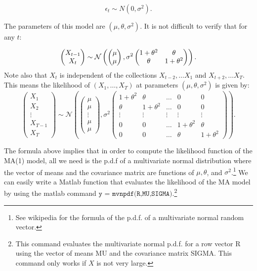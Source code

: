 \documentclass[12] {article}
\begin{document}
$$ \epsilon_{t} \sim N(0, \sigma^2).$$

\noindent The parameters of this model are $(\mu, \theta, \sigma^2)$. It is not difficult to verify that for any $t$:

$$   
\begin{pmatrix}
X_{t-1} \\
X_{t}
\end{pmatrix} \sim 
\mathcal{N} 
\left( 
\begin{pmatrix}
\mu \\
\mu
\end{pmatrix}, \\
\sigma^2 \begin{pmatrix}
1+ \theta^2 & \theta \\
\theta & 1+ \theta^2
\end{pmatrix}
\right).
$$
\noindent Note also that $X_{t}$ is independent of the collections $X_{t-2}, \ldots X_{1}$ and  $X_{t+2}, \ldots X_{T}$. This means the likelihood of $(X_1,\ldots, X_{T})$ at parameters $(\mu, \theta, \sigma^2)$
is given by:
\begin{equation}\label{equation:LikelihoodMA1}
\begin{pmatrix}
X_1 \\ X_2 \\ \vdots \\ X_{T-1} \\ X_{T} 
\end{pmatrix}
\sim \mathcal{N} \left( 
\begin{pmatrix}
\mu \\ \mu \\ \vdots \\ \mu \\ \mu
\end{pmatrix}, 
\sigma^2
\begin{pmatrix}
1 + \theta^2 & \theta & \ldots & 0 & 0 \\
\theta & 1+\theta^2 & \ldots & 0 &0 \\
\vdots & \vdots & \vdots & \vdots & \vdots \\
0 & 0 & \ldots & 1+\theta^2 & \theta \\
0 & 0 & \ldots & \theta & 1  + \theta^2
\end{pmatrix}
\right).
\end{equation}

The formula above implies that in order to compute the likelihood function of the MA(1) model, all we need is the p.d.f of a multivariate normal distribution where the vector of means and the covariance matrix are functions of $\mu, \theta$, and $\sigma^2$.\footnote{See wikipedia for the formula of the p.d.f. of a multivariate normal random vector.}  We can easily write a Matlab function that evaluates the likelihood of the MA model by using the matlab command $\texttt{y = mvnpdf(R,MU,SIGMA)}$.\footnote{This command evaluates the multivariate normal p.d.f. for a row vector R using the vector of means MU and the covariance matrix SIGMA. This command only works if $X$ is not very large. } \\
\end{document}
